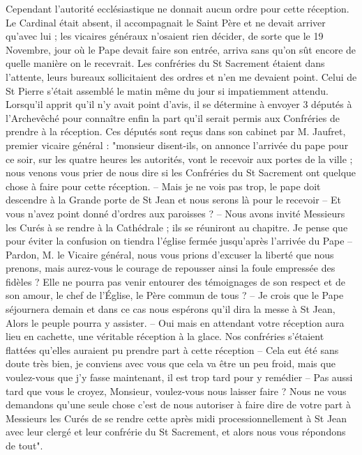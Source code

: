 \documentclass[11pt,a4paper]{report}
\begin{document}
Cependant l'autorité ecclésiastique ne donnait aucun ordre pour cette réception. Le Cardinal était absent, il accompagnait le Saint Père et ne devait arriver qu'avec lui ; les vicaires généraux n'osaient rien décider, de sorte que le 19 Novembre, jour où le Pape devait faire son entrée, arriva sans qu'on sût encore de quelle manière on le recevrait. Les confréries du St Sacrement étaient dans l'attente, leurs bureaux sollicitaient des ordres et n'en me devaient point. Celui de St Pierre s'était assemblé le matin même du jour si impatiemment attendu. Lorsqu'il apprit qu'il n'y avait point d'avis, il se détermine à envoyer 3 députés à l'Archevêché pour connaître enfin la part qu'il serait permis aux Confréries de prendre à la réception. Ces députés sont reçus dans son cabinet par M. Jaufret, premier vicaire général : "monsieur disent-ils, on annonce l'arrivée du pape pour ce soir, sur les quatre heures les autorités, vont le recevoir aux portes de la ville ; nous venons vous prier de nous dire si les Confréries du St Sacrement ont quelque chose à faire pour cette réception. -- Mais je ne vois pas trop, le pape doit descendre à la Grande porte de St Jean et nous serons là pour le recevoir -- Et vous n'avez point donné d'ordres aux paroisses ? -- Nous avons invité Messieurs les Curés à se rendre à la Cathédrale ; ils se réuniront au chapitre. Je pense que pour éviter la confusion on tiendra l'église fermée jusqu'après l'arrivée du Pape -- Pardon, M. le Vicaire général, nous vous prions d'excuser la liberté que nous prenons, mais aurez-vous le courage de repousser ainsi la foule empressée des fidèles ? Elle ne pourra pas venir entourer des témoignages de son respect et de son amour, le chef de l'Église, le Père commun de tous ? -- Je crois que le Pape séjournera demain et dans ce cas nous espérons qu'il dira la messe à St Jean, Alors le peuple pourra y assister. -- Oui mais en attendant votre réception aura lieu en cachette, une véritable réception à la glace. Nos confréries s'étaient flattées qu'elles auraient pu prendre part à cette réception -- Cela eut été sans doute très bien, je conviens avec vous que cela va être un peu froid, mais que voulez-vous que j'y fasse maintenant, il est trop tard pour y remédier -- Pas aussi tard que vous le croyez, Monsieur, voulez-vous nous laisser faire ? Nous ne vous demandons qu'une seule chose c'est de nous autoriser à faire dire de votre part à Messieurs les Curés de se rendre cette après midi processionnellement à St Jean avec leur clergé et leur confrérie du St Sacrement, et alors nous vous répondons de tout".
\end{document}
